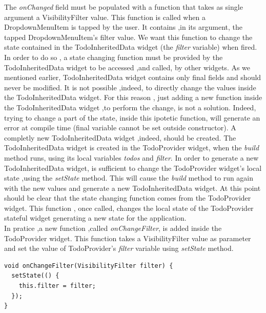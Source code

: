 The \textit{onChanged  }field must be populated with a function that takes as single argument a VisibilityFilter value. This function is called when a DropdownMenuItem is tapped by the user. It contains ,in its argument, the tapped DropdownMenuItem's filter value.  We want this function to change the state contained in the TodoInheritedData widget (the \textit{filter} variable) when fired. In order to do so , a state changing function must be provided by the TodoInheritedData widget to be accessed ,and called, by other widgets. As we mentioned earlier, TodoInheritedData widget contains only final fields and should never be modified. It is not possible ,indeed, to directly change the values inside the TodoInheritedData widget. For this reason , just adding a new function inside the TodoInheritedData widget ,to perform the change, is not a solution. Indeed, trying to change a part of the state, inside this ipotetic function, will generate an error at compile time (final variable cannot be set outside constructor). A completly new TodoInheritedData widget ,indeed, should be created. The TodoInheritedData widget is created in the TodoProvider widget, when the \textit{build} method runs, using its local variables \textit{todos }and \textit{filter}. In order to generate a new TodoInheritedData widget, is sufficient to change the TodoProvider widget's local state ,using the \textit{setState} method. This will cause the \textit{build} method to run again with the new values and generate a new TodoInheritedData widget. At this point should be clear that the state changing function comes from the TodoProvider widget. This function , once called, changes the local state of the TodoProvider stateful widget generating a new state for the application.\\
In pratice ,a new function ,called \textit{onChangeFilter}, is added inside the TodoProvider widget. This function takes a VisibilityFilter value as parameter and set the  value of TodoProvider's \textit{filter} variable using \textit{setState} method. 
\mbox{}\\
\begin{code}
 \mbox{}

\label{code:2.23}
\begin{verbatim}
void onChangeFilter(VisibilityFilter filter) {
  setState(() {
    this.filter = filter;
  });
}
\end{verbatim}
\end{code}
\mbox{}\\
